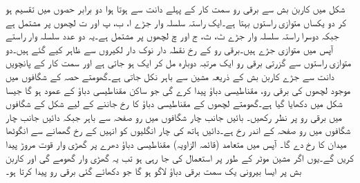 شکل   میں کاربن بش سے برقی رو سمت کار کے پہلے دانت سے ہوتا ہوا دو برابر حصوں  میں تقسیم ہو کر دو یکساں متوازی راستوں بہتا ہے۔ایک راستہ سلسلہ وار جڑے ا، ب، پ اور ت لچھوں پر مشتمل ہے جبکہ دوسرا راستہ سلسلہ وار جڑے ٹ، ث، ج اور چ لچھوں پر مشتمل  ہے۔یہ دو عدد سلسلہ وار راستے آپس میں متوازی جڑے ہیں۔برقی رو کے رخ نقطہ دار نوک دار لکیروں سے ظاہر کیے گئے ہیں۔دو متوازی راستوں سے گزرتی برقی رو ایک مرتبہ دوبارہ مل کر ایک ہو جاتی ہے اور سمت کار کے پانچویں دانت سے جڑے کاربن بش کے ذریعہ مشین سے باہر نکل جاتی  ہے۔گھومتے حصہ کے شگافوں میں موجود لچھوں کی  برقی رو،  مقناطیسی دباؤ پیدا کرے گی  جو ساکن مقناطیسی دباؤ کے عمود ہو گا جیسا شکل   میں دکھایا گیا ہے۔گھومتے لچھوں کے مقناطیسی دباؤ کا  رخ جاننے  کے لیے
 شکل  کے  شگافوں  میں برقی رو پر نظر رکھیں۔ بائیں جانب چار شگافوں میں رو صفحہ سے باہر جبکہ دائیں جانب چار شگافوں میں رو صفحہ کے اندر رخ ہے۔دائیں ہاتھ کی چار انگلیوں کو انہیں کے رخ گھمانے سے انگوٹھا میدان کا رخ دے گا۔ آپس میں متعامد (قائمہ الزاویہ)   مقناطیسی دباؤ دھرے پر گھڑی وار قوت مروڑ پیدا کریں گے۔یوں اگر مشین موٹر کے طور پر استعمال کی جا رہی ہو تب یہ گھڑی وار گھومے گی اور کاربن بش پر ایسا بیرونی یک سمت  برقی دباؤ لاگو ہو گا جو دکھائے گئی  برقی رو پیدا کرتا ہو۔
